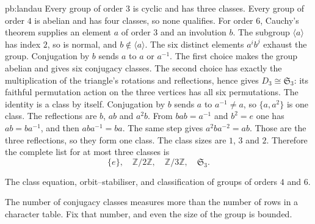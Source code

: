 \begin{solution}{pb:landau}
Every group of order $3$ is cyclic and has three classes. Every group of order $4$ is abelian and has four classes, so none qualifies. For order $6$, Cauchy's theorem supplies an element $a$ of order $3$ and an involution $b$. The subgroup $\langle a\rangle$ has index $2$, so is normal, and $b\notin\langle a\rangle$. The six distinct elements $a^i b^j$ exhaust the group. Conjugation by $b$ sends $a$ to $a$ or $a^{-1}$. The first choice makes the group abelian and gives six conjugacy classes. The second choice has exactly the multiplication of the triangle's rotations and reflections, hence gives $D_3\cong\mathfrak S_3$: its faithful permutation action on the three vertices has all six permutations. The identity is a class by itself. Conjugation by $b$ sends $a$ to $a^{-1}\ne a$, so $\{a,a^2\}$ is one class. The reflections are $b$, $ab$ and $a^2b$. From $bab=a^{-1}$ and $b^2=e$ one has $ab=ba^{-1}$, and then $aba^{-1}=ba$. The same step gives $a^2ba^{-2}=ab$. Those are the three reflections, so they form one class. The class sizes are $1$, $3$ and $2$. Therefore the complete list for at most three classes is
\[
\boxed{\{e\},\quad\mathbb Z/2\mathbb Z,\quad
       \mathbb Z/3\mathbb Z,\quad\mathfrak S_3.}
\]

\tools The class equation, orbit--stabiliser, and classification of groups of orders $4$ and $6$.

\leads The number of conjugacy classes measures more than the number of rows in a character table. Fix that number, and even the size of the group is bounded.
\end{solution}

